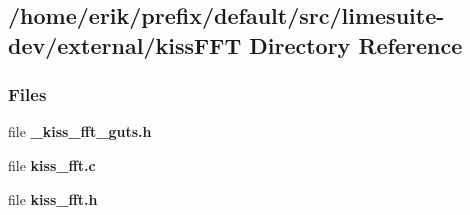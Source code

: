 \subsection{/home/erik/prefix/default/src/limesuite-\/dev/external/kiss\+F\+FT Directory Reference}
\label{dir_f8dc97bebc93e7a8a087e336d65b4563}
\subsubsection*{Files}
\begin{DoxyCompactItemize}
\item 
file {\bf \+\_\+kiss\+\_\+fft\+\_\+guts.\+h}
\item 
file {\bf kiss\+\_\+fft.\+c}
\item 
file {\bf kiss\+\_\+fft.\+h}
\end{DoxyCompactItemize}
